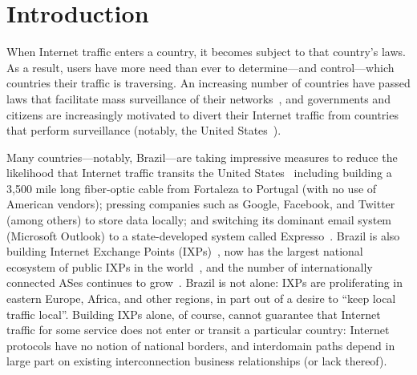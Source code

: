 \section{Introduction}
\label{intro}

When Internet traffic enters a country, it becomes subject to that
country's laws.  As a result, users have more need than ever to
determine---and control---which countries their traffic is traversing.
An increasing number of countries have passed laws that facilitate mass
surveillance of their networks~\cite{france_surveillance,
  netherlands_surveillance, kazak_surveillance, uk_bill}, and governments
and citizens are increasingly motivated to divert their Internet traffic
from countries that perform surveillance (notably, the United
States~\cite{russia_secure_internet,
  routing_errors, dte}).

Many countries---notably, Brazil---are taking impressive measures to reduce
the likelihood that Internet traffic transits the United
States~\cite{brazil_history, brazil_break_from_US, brazil_conference,
  brazil_conference2, brazil_human_rights} including building a 3,500
mile long fiber-optic cable from Fortaleza to Portugal (with no use of
American vendors); pressing companies such as Google, Facebook, and
Twitter (among others) to store data locally; and switching its dominant
email system (Microsoft Outlook) to a state-developed system called
Expresso~\cite{brazil_cable, brazil_us_companies}.  Brazil is also
building Internet Exchange Points (IXPs)~\cite{brazil_IXP1}, now has the
largest national ecosystem of public IXPs in
the world~\cite{brazil_ixp_ecosystem}, and the number of internationally
connected ASes continues to
grow~\cite{brazil_international_ases}. Brazil is not alone: IXPs are
proliferating in eastern Europe, Africa, and other regions, in part out
of a desire to ``keep local traffic local''. Building IXPs alone, of
course, cannot guarantee that Internet traffic for some service does not
enter or transit a particular country: Internet protocols have no notion
of national borders, and interdomain paths depend in large part on
existing interconnection business relationships (or lack thereof).  

